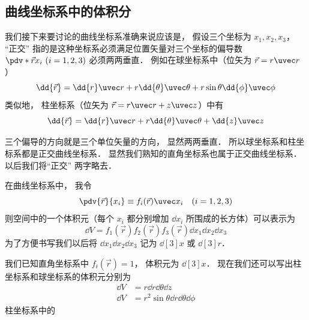 \subsection{曲线坐标系中的体积分}
我们接下来要讨论的曲线坐标系准确来说应该是， 假设三个坐标为 $x_1, x_2, x_3$， “正交” 指的是这种坐标系必须满足位置矢量对三个坐标的偏导数 $\pdv*{\vec r}{x_i} \,\, (i = 1,2,3)$ 必须两两垂直． 例如在球坐标系中（位矢为 $\vec r = r\uvec r$）
\begin{equation}
\dd{\vec r} = \dd{r} \uvec r + r\dd{\theta} \uvec\theta + r\sin\theta\dd{\phi}\uvec\phi
\end{equation}
类似地， 柱坐标系（位矢为 $\vec r = r\uvec r + z\uvec z$）中有
\begin{equation}
\dd{\vec r} = \dd{r} \uvec r + r\dd{\theta} \uvec\theta + \dd{z}\uvec z
\end{equation}

三个偏导的方向就是三个单位矢量的方向， 显然两两垂直． 所以球坐标系和柱坐标系都是正交曲线坐标系． 显然我们熟知的直角坐标系也属于正交曲线坐标系． 以后我们将“正交” 两字略去．

在曲线坐标系中， 我令
\begin{equation}
\pdv{\vec r}{x_i} \equiv f_i(\vec r)\uvec x_i \quad (i = 1,2,3)
\end{equation}
则空间中的一个体积元（每个 $x_i$ 都分别增加 $\dd{x_i}$ 所围成的长方体）可以表示为
\begin{equation}
\dd{V} = f_1(\vec r)f_2(\vec r)f_3(\vec r)\dd{x_1}\dd{x_2}\dd{x_3}
\end{equation}
为了方便书写我们以后将 $\dd{x_1}\dd{x_2}\dd{x_3}$ 记为 $\dd[3]{x}$ 或 $\dd[3]{r}$．

我们已知直角坐标系中 $f_i(\vec r) = 1$， 体积元为 $\dd[3]{x}$． 现在我们还可以写出柱坐标系和球坐标系的体积元分别为
\begin{align}
\dd{V} &= r \dd{r}\dd{\theta}\dd{z}\\
\dd{V} &= r^2\sin\theta \dd{r}\dd{\theta}\dd{\phi}
\end{align}
柱坐标系中的
